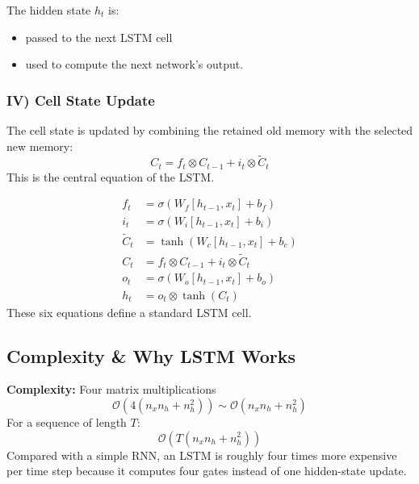 The hidden state $h_t$ is:
\begin{itemize}
    \item passed to the next LSTM cell
    \item used to compute the next network's output.
\end{itemize}

\subsubsection{IV) Cell State Update}

The cell state is updated by combining the retained old memory with the selected new memory:
\begin{equation}
C_t = f_t \otimes C_{t-1} + i_t \otimes \tilde{C}_t
\end{equation}
This is the central equation of the LSTM.

\begin{propertybox}
\begin{align}
f_t &= \sigma(W_f [h_{t-1}, x_t] + b_f) \\
i_t &= \sigma(W_i [h_{t-1}, x_t] + b_i) \\
\tilde{C}_t &= \tanh(W_c [h_{t-1}, x_t] + b_c) \\
C_t &= f_t \otimes C_{t-1} + i_t \otimes \tilde{C}_t \\
o_t &= \sigma(W_o [h_{t-1}, x_t] + b_o) \\
h_t &= o_t \otimes \tanh(C_t)
\end{align}
These six equations define a standard LSTM cell.
\end{propertybox}

\subsection{Complexity \& Why LSTM Works}

\textbf{Complexity:} Four matrix multiplications
\begin{equation}
\mathcal{O}(4(n_x n_h + n_h^2)) \sim \mathcal{O}(n_x n_h + n_h^2)
\end{equation}
For a sequence of length $T$:
\begin{equation}
\mathcal{O}(T(n_x n_h + n_h^2))
\end{equation}
Compared with a simple RNN, an LSTM is roughly four times more expensive per time step because it computes four gates instead of one hidden-state update.

